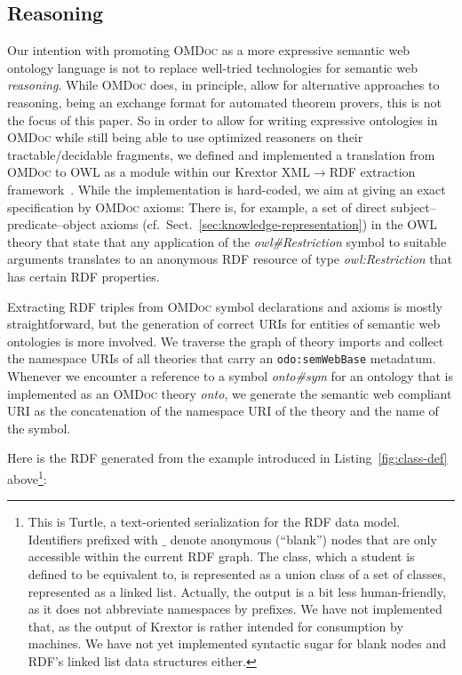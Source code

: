 \documentclass{llncs}
\renewcommand{\omdoc}{\textsc{OMDoc}\xspace}
\begin{document}
\subsection{Reasoning}\label{sec:reasoning}

Our intention with promoting \omdoc as a more expressive semantic web ontology language is
not to replace well-tried technologies for semantic web \emph{reasoning}.  While \omdoc
does, in principle, allow for alternative approaches to reasoning, being an exchange
format for automated theorem provers, this is not the focus of this paper.  So in order to
allow for writing expressive ontologies in \omdoc while still being able to use optimized
reasoners on their tractable/decidable fragments, we defined and implemented a translation
from \omdoc to OWL as a module within our Krextor XML$\to$RDF extraction
framework~\cite{krextor:webpage}.  While the implementation is hard-coded, we aim at
giving an exact specification by \omdoc axioms: There is, for example, a set of direct
subject--predicate--object axioms (cf.\ Sect.~\ref{sec:knowledge-representation}) in the
OWL theory that state that any application of the \textit{owl\#Restriction} symbol to
suitable arguments translates to an anonymous RDF resource of type
\textit{owl:Restriction} that has certain RDF properties.{\ifpublic \else

\fi} Extracting RDF triples from {\omdoc} symbol declarations and axioms is mostly
straightforward, but the generation of correct URIs for entities of semantic web
ontologies is more involved.  We traverse the graph of theory imports and collect the
namespace URIs of all theories that carry an \texttt{odo:semWebBase} metadatum.  Whenever
we encounter a reference to a symbol \textit{onto\#sym} for an ontology that is
implemented as an {\omdoc} theory \textit{onto}, we generate the semantic web compliant
URI as the concatenation of the namespace URI of the theory and the name of the symbol. \ifpublic  \else

\fi Here is the RDF generated from the example introduced in Listing~\ref{fig:class-def}
above\footnote{This is Turtle, a text-oriented serialization for the RDF data model.
  Identifiers prefixed with $\_$ denote anonymous (``blank'') nodes that are only
  accessible within the current RDF graph.  The class, which a student is defined to be
  equivalent to, is represented as a union class of a set of classes, represented as a
  linked list. \ifpublic\else Actually, the output is a bit less human-friendly, as it does not
  abbreviate namespaces by prefixes.  We have not implemented that, as the output of
  Krextor is rather intended for consumption by machines.  We have not yet implemented
  syntactic sugar for blank nodes and RDF's linked list data structures either.\fi}:
\end{document}
